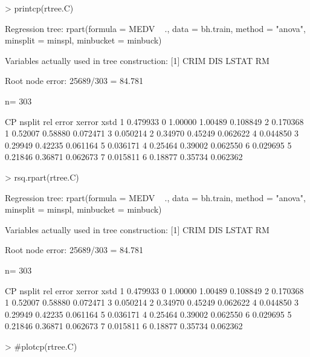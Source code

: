 \documentclass{article}
\begin{document}
\begin{Schunk}
\begin{Sinput}
> printcp(rtree.C)
\end{Sinput}
\begin{Soutput}
Regression tree:
rpart(formula = MEDV ~ ., data = bh.train, method = "anova", 
    minsplit = minspl, minbucket = minbuck)

Variables actually used in tree construction:
[1] CRIM  DIS   LSTAT RM   

Root node error: 25689/303 = 84.781

n= 303 

        CP nsplit rel error  xerror     xstd
1 0.479933      0   1.00000 1.00489 0.108849
2 0.170368      1   0.52007 0.58880 0.072471
3 0.050214      2   0.34970 0.45249 0.062622
4 0.044850      3   0.29949 0.42235 0.061164
5 0.036171      4   0.25464 0.39002 0.062550
6 0.029695      5   0.21846 0.36871 0.062673
7 0.015811      6   0.18877 0.35734 0.062362
\end{Soutput}
\begin{Sinput}
> rsq.rpart(rtree.C)
\end{Sinput}
\begin{Soutput}
Regression tree:
rpart(formula = MEDV ~ ., data = bh.train, method = "anova", 
    minsplit = minspl, minbucket = minbuck)

Variables actually used in tree construction:
[1] CRIM  DIS   LSTAT RM   

Root node error: 25689/303 = 84.781

n= 303 

        CP nsplit rel error  xerror     xstd
1 0.479933      0   1.00000 1.00489 0.108849
2 0.170368      1   0.52007 0.58880 0.072471
3 0.050214      2   0.34970 0.45249 0.062622
4 0.044850      3   0.29949 0.42235 0.061164
5 0.036171      4   0.25464 0.39002 0.062550
6 0.029695      5   0.21846 0.36871 0.062673
7 0.015811      6   0.18877 0.35734 0.062362
\end{Soutput}
\begin{Sinput}
> #plotcp(rtree.C)
\end{Sinput}
\end{Schunk}
\end{document}
